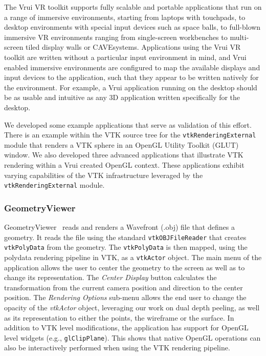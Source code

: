 The Vrui VR toolkit supports fully scalable and portable applications that run on a range of immersive environments, starting from laptops with touchpads, to desktop environments with special input devices such as space balls, to full-blown immersive VR environments ranging from single-screen workbenches to multi-screen tiled display walls or CAVE\texttrademark systems. Applications using the Vrui VR toolkit are written without a particular input environment in mind, and Vrui enabled immersive environments are configured to map the available displays and input devices to the application, such that they appear to be written natively for the environment. For example, a Vrui application running on the desktop should be as usable and intuitive as any 3D application written specifically for the desktop.

We developed some example applications that serve as validation of this effort. There is an example within the VTK source tree for the \texttt{vtkRenderingExternal} module that renders a VTK sphere in an OpenGL Utility Toolkit (GLUT) window. We also developed three advanced applications that illustrate VTK rendering within a Vrui created OpenGL context. These applications exhibit varying capabilities of the VTK infrastructure leveraged by the \texttt{vtkRenderingExternal} module. 

\subsubsection{GeometryViewer}

GeometryViewer~\cite{GeometryViewer} reads and renders a Wavefront (.obj) file that defines a geometry.
It reads the file using the standard \texttt{vtkOBJFileReader} that creates \texttt{vtkPolyData} from the geometry.
The \texttt{vtkPolyData} is then mapped, using the polydata rendering pipeline in VTK, as a \texttt{vtkActor} object.
The main menu of the application allows the user to center the geometry to the screen as well as to change its representation.
The \textit{Center Display} button calculates the transformation from the current camera position and direction to the center position.
The \textit{Rendering Options} sub-menu allows the end user to change the opacity of the \textit{vtkActor} object, leveraging our work on dual depth peeling, as well as its representation to either the points, the wireframe or the surface.
In addition to VTK level modifications, the application has support for OpenGL level widgets (e.g., \texttt{glClipPlane}).
This shows that native OpenGL operations can also be interactively performed when using the VTK rendering pipeline.

